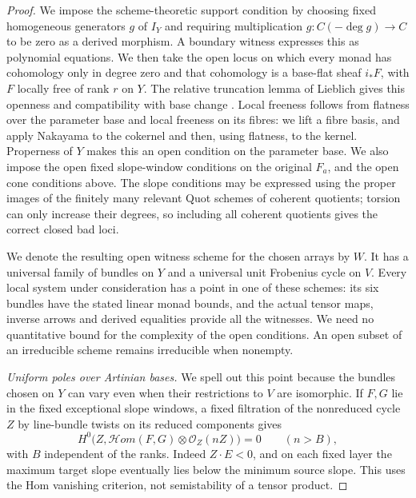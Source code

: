 \begin{proof}
We impose the scheme-theoretic support condition by choosing fixed
homogeneous generators $g$ of $I_Y$ and requiring multiplication
$g:C(-\deg g)\to C$ to be zero as a derived morphism. A boundary witness
expresses this as polynomial equations. We then take the open locus on
which every monad has cohomology only in degree zero and that cohomology
is a base-flat sheaf $i_*F$, with $F$ locally free of rank $r$ on $Y$.
The relative truncation lemma of Lieblich gives this openness and
compatibility with base change
\citep[Lemma~2.1.4, pp.~4--5]{C_Lieblich2006}. Local freeness follows
from flatness over the parameter base and local freeness on its fibres:
we lift a fibre basis, and apply Nakayama to the cokernel and then, using
flatness, to the kernel. Properness of $Y$ makes this an open condition
on the parameter base. We also impose the open fixed slope-window
conditions on the original $F_a$, and the open cone conditions above.
The slope conditions may be expressed using the proper images of the
finitely many relevant Quot schemes of coherent quotients; torsion can
only increase their degrees, so including all coherent quotients gives
the correct closed bad loci.

We denote the resulting open witness scheme for the chosen arrays by $W$.
It has a universal family of bundles on $Y$ and a universal unit Frobenius
cycle on $V$. Every local system under consideration has a point in one
of these schemes: its six bundles have the stated linear monad bounds,
and the actual tensor maps, inverse arrows and derived equalities provide
all the witnesses. We need no quantitative bound for the complexity of
the open conditions. An open subset of an irreducible scheme remains
irreducible when nonempty.

\emph{Uniform poles over Artinian bases.}
We spell out this point because the bundles chosen on $Y$ can vary even
when their restrictions to $V$ are isomorphic. If $F,G$ lie in the fixed
exceptional slope windows, a fixed filtration of the nonreduced cycle
$Z$ by line-bundle twists on its reduced components gives
\[
 H^0\bigl(Z,\mathcal Hom(F,G)\otimes\mathcal O_Z(nZ)\bigr)=0
 \qquad(n>B),
\]
with $B$ independent of the ranks. Indeed $Z\cdot E<0$, and on each fixed
layer the maximum target slope eventually lies below the minimum source
slope. This uses the Hom vanishing criterion, not semistability of a
tensor product.


\end{proof}

